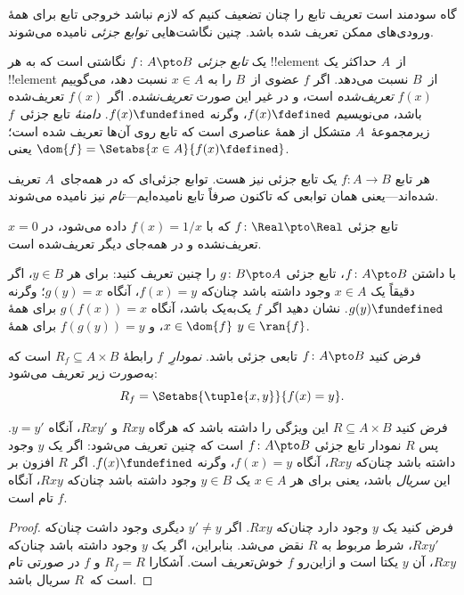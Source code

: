\documentclass[../../../include/open-logic-section]{subfiles}
\begin{document}


\begin{explain}
گاه سودمند است تعریف تابع را چنان تضعیف کنیم که لازم نباشد
خروجی تابع برای همهٔ ورودی‌های ممکن تعریف شده باشد. چنین
نگاشت‌هایی \emph{توابع جزئی} نامیده می‌شوند.
\end{explain}

\begin{defn}
یک \emph{تابع جزئی} $f \colon A \pto B$ نگاشتی است که
به هر !!{element} از~$A$ حداکثر یک !!{element} از~$B$ نسبت می‌دهد.
اگر $f$ عضوی از~$B$ را به $x \in A$ نسبت دهد، می‌گوییم $f(x)$
\emph{تعریف‌شده} است، و در غیر این صورت \emph{تعریف‌نشده}. اگر $f(x)$ تعریف‌شده باشد،
می‌نویسیم $f(x) \fdefined$، وگرنه $f(x) \fundefined$. \emph{دامنهٔ}
تابع جزئی~$f$ زیرمجموعهٔ~$A$ متشکل از همهٔ عناصری است که تابع روی آن‌ها
تعریف شده است؛ یعنی $\dom{f} = \Setabs{x \in A}{f(x) \fdefined}$.
\end{defn}

\begin{ex}
هر تابع $f\colon A \to B$ یک تابع جزئی نیز هست. توابع
جزئی‌ای که در همه‌جای~$A$ تعریف شده‌اند---یعنی همان توابعی که تاکنون
صرفاً تابع نامیده‌ایم---\emph{تام} نیز نامیده
می‌شوند.
\end{ex}

\begin{ex}
تابع جزئی $f \colon \Real \pto \Real$ که با $f(x) = 1/x$
داده می‌شود، در $x = 0$ تعریف‌نشده و در همه‌جای دیگر تعریف‌شده است.
\end{ex}

\begin{prob}
با داشتن $f\colon A \pto B$، تابع جزئی $g\colon B \pto
A$ را چنین تعریف کنید: برای هر $y \in B$، اگر دقیقاً یک $x \in A$ وجود داشته باشد
چنان‌که $f(x) = y$، آنگاه $g(y) = x$؛ وگرنه $g(y) \fundefined$. نشان دهید
اگر $f$ یک‌به‌یک باشد، آنگاه $g(f(x)) = x$ برای همهٔ $x \in \dom{f}$، و
$f(g(y)) = y$ برای همهٔ $y \in \ran{f}$.
\end{prob}

\begin{defn}
فرض کنید $f\colon A \pto B$ تابعی جزئی باشد. \emph{نمودارِ}~$f$
رابطهٔ $R_f \subseteq A \times B$ است که به‌صورت زیر تعریف می‌شود:
\[
R_f = \Setabs{\tuple{x,y}}{f(x) = y}.
\]
\end{defn}

\begin{prop}
فرض کنید $R \subseteq A \times B$ این ویژگی را داشته باشد که هرگاه $Rxy$
و $Rxy'$، آنگاه $y = y'$. پس $R$ نمودار تابع جزئی
$f\colon A \pto B$ است که چنین تعریف می‌شود: اگر یک $y$ وجود داشته باشد چنان‌که
$Rxy$، آنگاه $f(x) = y$، وگرنه $f(x) \fundefined$. اگر $R$ افزون بر این
\emph{سریال} باشد، یعنی برای هر $x \in A$ یک $y \in B$ وجود داشته باشد چنان‌که
$Rxy$، آنگاه $f$ تام است.
\end{prop}

\begin{proof}
فرض کنید یک $y$ وجود دارد چنان‌که $Rxy$. اگر $y'
\neq y$ دیگری وجود داشت چنان‌که $Rxy'$، شرط مربوط به $R$
نقض می‌شد. بنابراین، اگر یک $y$ وجود داشته باشد چنان‌که $Rxy$، آن $y$
یکتا است و ازاین‌رو $f$ خوش‌تعریف است. آشکارا $R_f = R$ و $f$ در صورتی
تام است که~$R$ سریال باشد.
\end{proof}
\end{document}
